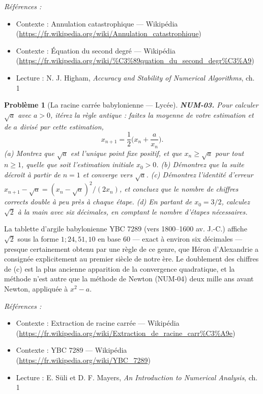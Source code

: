 \documentclass[11pt]{article}
\newtheorem{problem}{Problème}
\newenvironment{refs}{\par\small\noindent\emph{Références :}\begin{itemize}\setlength\itemsep{0pt}}{\end{itemize}\normalsize}
\begin{document}
\begin{refs}
\item Contexte : Annulation catastrophique --- Wikipédia (\url{https://fr.wikipedia.org/wiki/Annulation_catastrophique})
\item Contexte : Équation du second degré --- Wikipédia (\url{https://fr.wikipedia.org/wiki/%C3%89quation_du_second_degr%C3%A9})
\item Lecture : N. J. Higham, \textit{Accuracy and Stability of Numerical Algorithms}, ch. 1
\end{refs}

\bigskip

\begin{problem}[{La racine carrée babylonienne --- Lycée}]
\textbf{NUM-03.} Pour calculer $\sqrt{a}$ avec $a > 0$,
itérez la règle antique : faites la moyenne de votre estimation et de $a$ divisé par
cette estimation,
\[ x_{n+1} = \frac{1}{2}\Big( x_n + \frac{a}{x_n} \Big). \]
(a) Montrez que $\sqrt{a}$ est l'unique point fixe positif, et que
$x_n \ge \sqrt{a}$ pour tout $n \ge 1$, quelle que soit l'estimation initiale
$x_0 > 0$. (b) Démontrez que la suite décroît à partir de $n = 1$ et converge vers
$\sqrt{a}$. (c) Démontrez l'identité d'erreur
$x_{n+1} - \sqrt{a} = (x_n - \sqrt{a})^2/(2x_n)$, et concluez que le nombre de
chiffres corrects \textit{double} à peu près à chaque étape. (d) En partant de
$x_0 = 3/2$, calculez $\sqrt{2}$ à la main avec six décimales, en comptant le
nombre d'étapes nécessaires.
\end{problem}

\noindent La tablette d'argile babylonienne YBC 7289 (vers 1800--1600 av. J.-C.)
affiche $\sqrt{2}$ sous la forme $1;24,51,10$ en base 60 --- exact à environ six
décimales --- presque certainement obtenu par une règle de ce genre, que Héron
d'Alexandrie a consignée explicitement au premier siècle de notre ère. Le doublement
des chiffres de (c) est la plus ancienne apparition de la convergence quadratique, et
la méthode n'est autre que la méthode de Newton (NUM-04) deux mille ans avant Newton,
appliquée à $x^2 - a$.

\begin{refs}
\item Contexte : Extraction de racine carrée --- Wikipédia (\url{https://fr.wikipedia.org/wiki/Extraction_de_racine_carr%C3%A9e})
\item Contexte : YBC 7289 --- Wikipédia (\url{https://fr.wikipedia.org/wiki/YBC_7289})
\item Lecture : E. Süli et D. F. Mayers, \textit{An Introduction to Numerical Analysis}, ch. 1
\end{refs}
\end{document}
